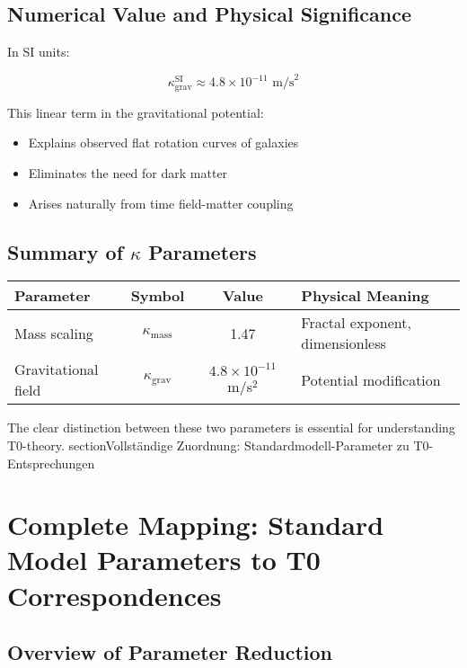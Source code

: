 \documentclass[12pt,a4paper]{article}
\begin{document}
	\subsection{Numerical Value and Physical Significance}
	
	In SI units:
	
	\begin{equation}
		\kappa_{\text{grav}}^{\text{SI}} \approx 4.8 \times 10^{-11} \text{ m/s}^2
	\end{equation}
	
	This linear term in the gravitational potential:
	\begin{itemize}
		\item Explains observed flat rotation curves of galaxies
		\item Eliminates the need for dark matter
		\item Arises naturally from time field-matter coupling
	\end{itemize}
	
	\subsection{Summary of $\kappa$ Parameters}
	
	\begin{center}
		\begin{tabular}{|l|c|c|l|}
			\hline
			\textbf{Parameter} & \textbf{Symbol} & \textbf{Value} & \textbf{Physical Meaning} \\
			\hline
			Mass scaling & $\kappa_{\text{mass}}$ & 1.47 & Fractal exponent, dimensionless \\
			Gravitational field & $\kappa_{\text{grav}}$ & $4.8 \times 10^{-11}$ m/s$^2$ & Potential modification \\
			\hline
		\end{tabular}
	\end{center}
	
	The clear distinction between these two parameters is essential for understanding T0-theory.
section{Vollständige Zuordnung: Standardmodell-Parameter zu T0-Entsprechungen}
\label{sec:sm_t0_mapping}



\section{Complete Mapping: Standard Model Parameters to T0 Correspondences}
\label{sec:sm_t0_mapping}

\subsection{Overview of Parameter Reduction}
\label{subsec:parameter_overview}
\end{document}
